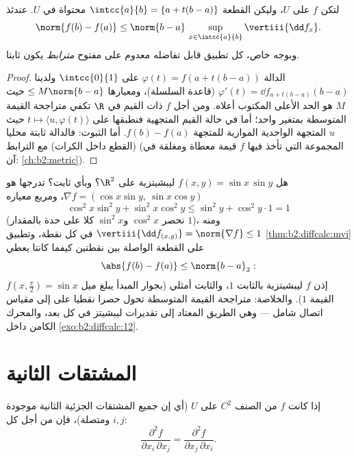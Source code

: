 \begin{theorem}\label{thm:b2:diffcalc:mvi}
لتكن $f$  على $U$، وليكن القطعة $\intcc{a}{b}
= \{a + t(b-a)\}$ محتواة في $U$. عندئذ
\[
\norm{f(b) - f(a)} \leq \norm{b - a}\,
\sup_{x \in \intcc{a}{b}} \vertiii{\dd f_x} .
\]
وبوجه خاص، كل تطبيق قابل  تفاضله معدوم على مفتوح
\emph{مترابط} يكون ثابتا.
\end{theorem}

\begin{proof}
الدالة $\varphi(t) = f(a + t(b-a))$  على
$\intcc{0}{1}$ ولدينا $\varphi'(t) = \dd f_{a + t(b-a)}(b - a)$
(قاعدة السلسلة)، ومعيارها $\leq M\norm{b-a}$ حيث $M$ هو الحد الأعلى المكتوب
أعلاه. ومن أجل $f$ ذات القيم في $\R$ تكفي متراجحة القيمة
المتوسطة بمتغير واحد؛ أما في حالة القيم المتجهية فنطبقها على $t \mapsto \langle u,
\varphi(t)\rangle$
حيث $u$ المتجهة الواحدية الموازية للمتجهة $f(b) - f(a)$.
أما الثبوت: فالدالة ثابتة محليا (القطع داخل الكرات) مع الترابط
(المجموعة التي تأخذ فيها $f$ قيمة معطاة  ومغلقة في آن:
\cref{ch:b2:metric}).
\end{proof}

\begin{example}\label{ex:b2:diffcalc:lipschitz}
هل $f(x, y) = \sin x\,\sin y$ ليبشيتزية على $\R^2$؟ وبأي ثابت؟ تدرجها هو $\nabla f = (\cos x\sin y,\
\sin x\cos y)$، ومربع
معياره
\[
\cos^2x\sin^2y + \sin^2x\cos^2y
\leq \sin^2 y + \cos^2y\cdot 1 = 1
\]
(نحصر $\cos^2x$ و$\sin^2x$ كلا على حدة بالمقدار $1$)، ومنه
$\vertiii{\dd f_{(x,y)}} = \norm{\nabla f} \leq 1$ في كل نقطة، وتطبيق \cref{thm:b2:diffcalc:mvi} على القطعة الواصلة بين نقطتين
كيفما كانتا يعطي
\[
\abs{f(b) - f(a)} \leq \norm{b - a}_2 :
\]
إذن $f$ ليبشيتزية بالثابت $1$، والثابت أمثلي (بجوار المبدأ يبلغ
ميل $f(x, \tfrac\pi2) = \sin x$ القيمة $1$). والخلاصة: متراجحة القيمة المتوسطة تحول
حصرا نقطيا على \omterm{def:b2:diffcalc:differential}{التفاضل} إلى مقياس اتصال شامل --- وهي الطريق
المعتاد إلى تقديرات ليبشيتز في كل بعد، والمحرك الكامن داخل
\cref{exo:b2:diffcalc:12}.
\end{example}

\section{المشتقات الثانية}

\begin{theorem}[شوارتز]\label{thm:b2:diffcalc:schwarz}
إذا كانت $f$ من الصنف $C^2$ على $U$ (أي إن جميع المشتقات
الجزئية الثانية موجودة ومتصلة)، فإن من أجل كل $i, j$:
\[
\frac{\partial^2 f}{\partial x_i\,\partial x_j}
= \frac{\partial^2 f}{\partial x_j\,\partial x_i} .
\]
\end{theorem}

